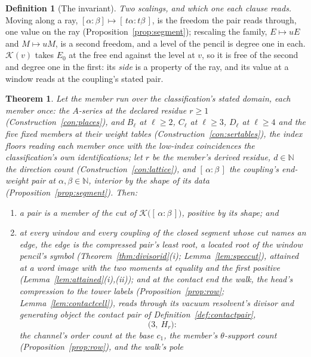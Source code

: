 \documentclass[11pt]{article}
\newtheorem{theorem}{Theorem}
\theoremstyle{definition}
\newtheorem{definition}{Definition}
\begin{document}
\begin{definition}[The invariant]
\emph{Two scalings, and which one each clause reads.} Moving along a ray,
$[\alpha\!:\!\beta]\mapsto[\,t\alpha\!:\!t\beta\,]$, is the freedom the
pair reads through, one value on the ray
(Proposition~\ref{prop:segment}); rescaling the family, $E\mapsto uE$ and
$M\mapsto uM$, is a second freedom, and a level of the pencil is degree one in
each. $\mathcal K(v)$ takes $E_0$ at
the free end against the level at $v$, so it is free of the second and
degree one in the first: its \emph{side} is a property of the ray, and
its value at a window reads at the coupling's stated pair.
\end{definition}

\begin{theorem}\label{thm:main}
Let the member run over the classification's stated domain, each
member once: the $A$-series at the declared residue $r\ge1$
(Construction~\ref{con:places}), and $B_\ell$ at $\ell\ge2$,
$C_\ell$ at $\ell\ge3$, $D_\ell$ at $\ell\ge4$ and the five fixed
members at their weight tables
(Construction~\ref{con:sertables}), the index floors reading each
member once with the low-index coincidences the classification's
own identifications; let $r$ be the member's derived residue,
$d\in\mathbb N$ the direction count
(Construction~\ref{con:lattice}), and $[\,\alpha:\beta\,]$ the
coupling's end-weight pair at $\alpha,\beta\in\mathbb N$, interior
by the shape of its data
(Proposition~\ref{prop:segment}). Then:
\begin{enumerate}[leftmargin=2em,itemsep=2pt]
\item a pair is a member of the cut of
      $\mathcal K\big([\,\alpha:\beta\,]\big)$, positive by its
      shape; and
\item at every window and every coupling of the closed segment
      whose cut names an edge, the edge is the compressed pair's
      least root, a located root of the window pencil's symbol
      (Theorem~\ref{thm:divisorid}(i); Lemma~\ref{lem:speccut}),
      attained at a word image
      with the two moments at equality and the first positive
      (Lemma~\ref{lem:attained}(i),(ii)); and at the contact end the
      walk, the head's compression to the tower labels
      (Proposition~\ref{prop:row}; Lemma~\ref{lem:contactcell}),
      reads through its vacuum
      resolvent's divisor and generating object the contact
      pair of Definition~\ref{def:contactpair},
      \[
        \big(3,\ H_r\big) :
      \]
      the channel's order count at the base $c_1$, the member's
      $\theta$-support count (Proposition~\ref{prop:row}), and
      the walk's pole

\end{enumerate}
\end{theorem}
\end{document}
